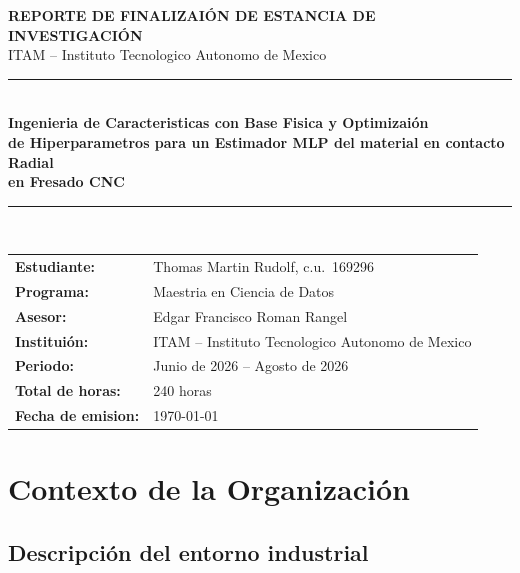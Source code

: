 \documentclass[12pt, letterpaper]{article}
\begin{document}
\thispagestyle{empty}
\begin{center}
  {\Large\bfseries\color{azulInst} REPORTE DE FINALIZAIÓN DE ESTANCIA DE INVESTIGACIÓN}\\[0.4cm]
  {\large ITAM -- Instituto Tecnologico Autonomo de Mexico}\\[0.8cm]
  \rule{\linewidth}{1pt}\\[0.4cm]
  {\LARGE\bfseries
    Ingenieria de Caracteristicas con Base Fisica y Optimizaión\\[0.2cm]
    de Hiperparametros para un Estimador MLP del material en contacto Radial\\[0.2cm]
    en Fresado CNC}\\[0.4cm]
  \rule{\linewidth}{1pt}\\[0.8cm]
\end{center}

\begin{tabular}{ll}
  \textbf{Estudiante:}       & Thomas Martin Rudolf, c.u.\ 169296 \\[0.2cm]
  \textbf{Programa:}         & Maestria en Ciencia de Datos \\[0.2cm]
  \textbf{Asesor:}           & Edgar Francisco Roman Rangel \\[0.2cm]
  \textbf{Instituión:}      & ITAM -- Instituto Tecnologico Autonomo de Mexico \\[0.2cm]
  \textbf{Periodo:}          & Junio de 2026 -- Agosto de 2026 \\[0.2cm]
  \textbf{Total de horas:}   & 240 horas \\[0.2cm]
  \textbf{Fecha de emision:} & \today \\
\end{tabular}

\newpage
\setcounter{page}{1}
\tableofcontents
\newpage

\section{Contexto de la Organización}

\subsection{Descripción del entorno industrial}
\end{document}
